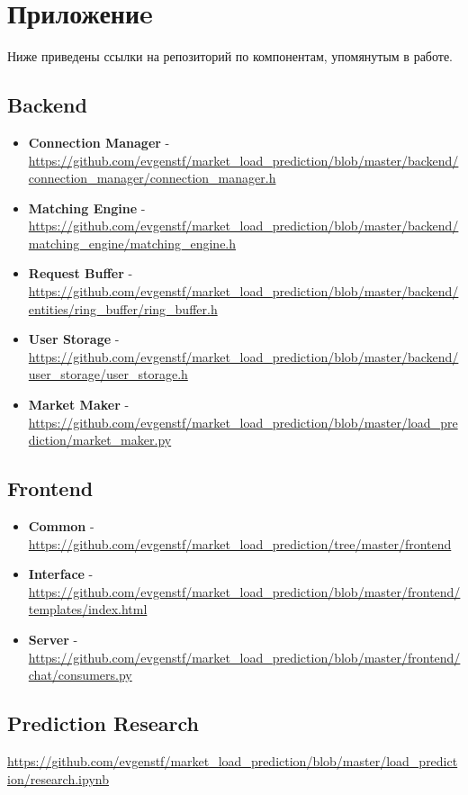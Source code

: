 \newpage
\section{Приложениe}

Ниже приведены ссылки на репозиторий по компонентам, упомянутым в работе.

\subsection{Backend}

\begin{itemize}
    \item \textbf{Connection Manager} - \url{https://github.com/evgenstf/market_load_prediction/blob/master/backend/connection_manager/connection_manager.h}
    \item \textbf{Matching Engine} - \url{https://github.com/evgenstf/market_load_prediction/blob/master/backend/matching_engine/matching_engine.h}
    \item \textbf{Request Buffer} - \url{https://github.com/evgenstf/market_load_prediction/blob/master/backend/entities/ring_buffer/ring_buffer.h}
    \item \textbf{User Storage} - \url{https://github.com/evgenstf/market_load_prediction/blob/master/backend/user_storage/user_storage.h}
    \item \textbf{Market Maker} - \url{https://github.com/evgenstf/market_load_prediction/blob/master/load_prediction/market_maker.py}

\end{itemize}
    
\subsection{Frontend}

\begin{itemize}
    \item \textbf{Common} - \url{https://github.com/evgenstf/market_load_prediction/tree/master/frontend}
    \item \textbf{Interface} - \url{https://github.com/evgenstf/market_load_prediction/blob/master/frontend/templates/index.html}
    \item \textbf{Server} - \url{https://github.com/evgenstf/market_load_prediction/blob/master/frontend/chat/consumers.py}
\end{itemize}

\subsection{Prediction Research}
\url{https://github.com/evgenstf/market_load_prediction/blob/master/load_prediction/research.ipynb}